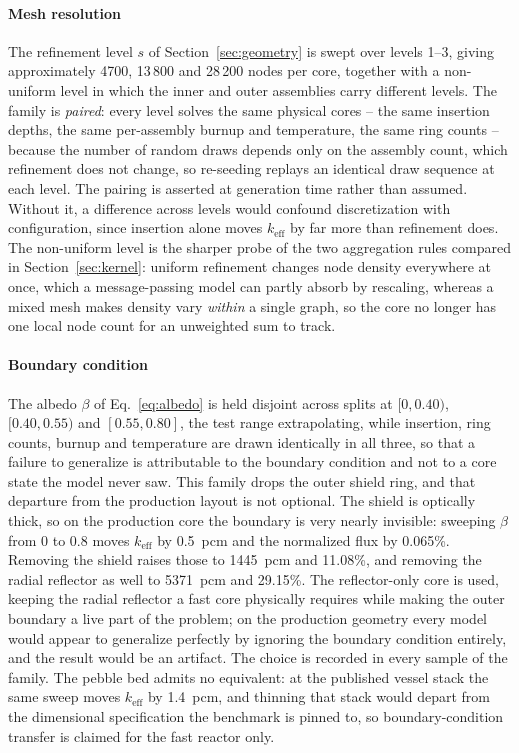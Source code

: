 \documentclass[preprint,12pt]{elsarticle}
\newcommand{\keff}{k_{\mathrm{eff}}}
\begin{document}
\paragraph{Mesh resolution} The refinement level $s$ of
Section~\ref{sec:geometry} is swept over levels 1--3, giving approximately 4700,
13\,800 and 28\,200 nodes per core, together with a non-uniform level in which
the inner and outer assemblies carry different levels. The family is
\emph{paired}: every level solves the same physical cores -- the same insertion
depths, the same per-assembly burnup and temperature, the same ring counts --
because the number of random draws depends only on the assembly count, which
refinement does not change, so re-seeding replays an identical draw sequence at
each level. The pairing is asserted at generation time rather than assumed.
Without it, a difference across levels would confound discretization with
configuration, since insertion alone moves $\keff$ by far more than refinement
does. The non-uniform level is the sharper probe of the two aggregation rules
compared in Section~\ref{sec:kernel}: uniform refinement changes node density
everywhere at once, which a message-passing model can partly absorb by
rescaling, whereas a mixed mesh makes density vary \emph{within} a single graph,
so the core no longer has one local node count for an unweighted sum to track.

\paragraph{Boundary condition} The albedo $\beta$ of Eq.~\eqref{eq:albedo} is
held disjoint across splits at $[0,0.40)$, $[0.40,0.55)$ and $[0.55,0.80]$, the
test range extrapolating, while insertion, ring counts, burnup and temperature
are drawn identically in all three, so that a failure to generalize is
attributable to the boundary condition and not to a core state the model never
saw. This family drops the outer shield ring, and that departure from the
production layout is not optional. The shield is optically thick, so on the
production core the boundary is very nearly invisible: sweeping $\beta$ from 0 to
0.8 moves $\keff$ by 0.5~pcm and the normalized flux by 0.065\%. Removing the
shield raises those to 1445~pcm and 11.08\%, and removing the radial reflector as
well to 5371~pcm and 29.15\%. The reflector-only core is used, keeping the
radial reflector a fast core physically requires while making the outer boundary
a live part of the problem; on the production geometry every model would appear
to generalize perfectly by ignoring the boundary condition entirely, and the
result would be an artifact. The choice is recorded in every sample of the
family. The pebble bed admits no equivalent: at the published vessel stack the
same sweep moves $\keff$ by 1.4~pcm, and thinning that stack would depart from
the dimensional specification the benchmark is pinned to, so boundary-condition
transfer is claimed for the fast reactor only.
\end{document}
